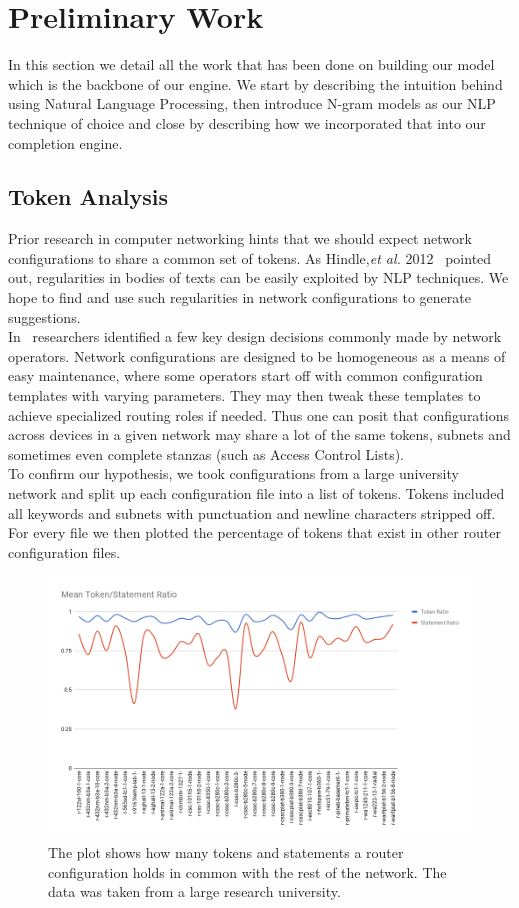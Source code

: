\section{Preliminary Work}
In this section we detail all the work that has been done on building our model which is the backbone of our engine. We start by describing the intuition behind using Natural Language Processing, then introduce N-gram models as our NLP technique of choice and close by describing how we incorporated that into our completion engine.

\subsection{Token Analysis}
Prior research in computer networking hints that we should expect network configurations to share a common set of tokens. As Hindle,\textit{et al.} 2012~\cite{naturalness} pointed out, regularities in bodies of texts can be easily exploited by NLP techniques. We hope to find and use such regularities in network configurations to generate suggestions.\\

In~\cite{complexity} researchers identified a few key design decisions commonly made by network operators. Network configurations are designed to be homogeneous as a means of easy maintenance, where some operators start off with common configuration templates with varying parameters. They may then tweak these templates to achieve specialized routing roles if needed. Thus one can posit that configurations across devices in a given network may share a lot of the same tokens, subnets and sometimes even complete stanzas (such as Access Control Lists).\\ 

To confirm our hypothesis, we took configurations from a large university network and split up each configuration file into a list of tokens. Tokens included all keywords and subnets with punctuation and newline characters stripped off. For every file we then plotted the percentage of tokens that exist in other router configuration files.

\begin{figure}[H]
	\centering
	\includegraphics[width=\textwidth]{chart.png}
	\caption{The plot shows how many tokens and statements a router configuration holds in common with the rest of the network. The data was taken from a large research university.}
\end{figure}

